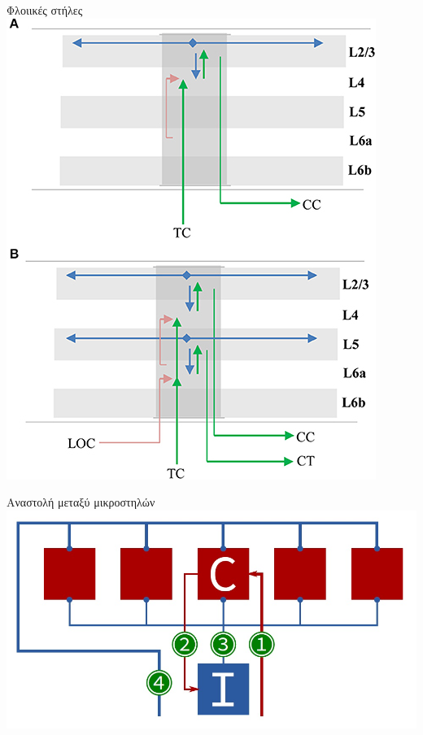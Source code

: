 \documentclass[10pt,lualatex]{beamer}
\begin{document}
\begin{frame}{Φλοιικές στήλες}
  \centering
  \includegraphics[width=.6\textwidth]{../figures/layers_in_column}
\end{frame}

\begin{frame}{Αναστολή μεταξύ μικροστηλών}
  \centering
  \includegraphics[width=\textwidth]{../figures/spatial_hardware}
\end{frame}
\end{document}
